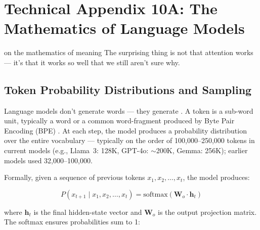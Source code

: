 
\chapter*{Technical Appendix 10A: The Mathematics of Language Models}
\label{app:ch10}

\begin{chapterquote}{on the mathematics of meaning}
The surprising thing is not that attention works --- it's that it works so well that we still aren't sure why.
\end{chapterquote}

\apxnumon
\section{Token Probability Distributions and Sampling}
\label{sec:app10-tokens}

Language models don't generate words --- they generate . A token is a sub-word unit, typically a word or a common word-fragment produced by Byte Pair Encoding (BPE) \autocite{sennrich2016bpe}. At each step, the model produces a probability distribution over the entire vocabulary --- typically on the order of 100{,}000--250{,}000 tokens in current models (e.g., Llama~3: 128K, GPT-4o: $\sim$200K, Gemma: 256K); earlier models used 32{,}000--100{,}000.

Formally, given a sequence of previous tokens $x_1, x_2, \ldots, x_t$, the model produces:

\begin{equation}
P(x_{t+1} \mid x_1, x_2, \ldots, x_t) = \text{softmax}(\mathbf{W}_o \cdot \mathbf{h}_t)
\label{eq:lm-prob}
\end{equation}

where $\mathbf{h}_t$ is the final hidden-state vector and $\mathbf{W}_o$ is the output projection matrix. The softmax ensures probabilities sum to 1:

